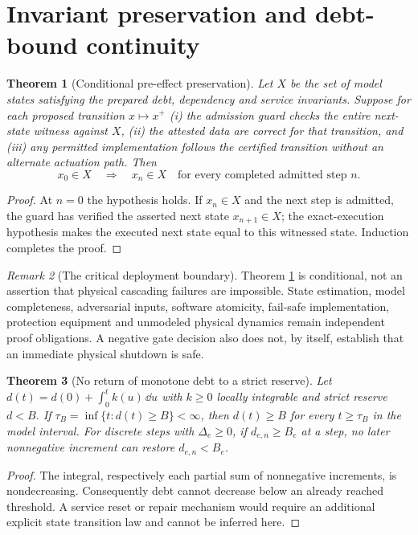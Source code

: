 \documentclass[11pt,letterpaper]{article}
\newtheorem{theorem}{Theorem}[section]
\theoremstyle{definition}\newtheorem{definition}[theorem]{Definition}\newtheorem{example}[theorem]{Example}
\theoremstyle{remark}\newtheorem{remark}[theorem]{Remark}
\begin{document}
\section{Invariant preservation and debt-bound continuity}
\begin{theorem}[Conditional pre-effect preservation]\label{th:invariant}
Let $X$ be the set of model states satisfying the prepared debt, dependency and service invariants. Suppose for each proposed transition $x\mapsto x^+$ (i) the admission guard checks the \emph{entire} next-state witness against $X$, (ii) the attested data are correct for that transition, and (iii) any permitted implementation follows the certified transition without an alternate actuation path. Then
\begin{equation}\label{eq:induction}
x_0\in X\quad\Longrightarrow\quad x_n\in X\quad\text{for every completed admitted step }n.
\end{equation}
\end{theorem}
\begin{proof}
At $n=0$ the hypothesis holds. If $x_n\in X$ and the next step is admitted, the guard has verified the asserted next state $x_{n+1}\in X$; the exact-execution hypothesis makes the executed next state equal to this witnessed state. Induction completes the proof.
\end{proof}
\begin{remark}[The critical deployment boundary]
Theorem \ref{th:invariant} is conditional, not an assertion that physical cascading failures are impossible. State estimation, model completeness, adversarial inputs, software atomicity, fail-safe implementation, protection equipment and unmodeled physical dynamics remain independent proof obligations. A negative gate decision also does not, by itself, establish that an immediate physical shutdown is safe.
\end{remark}
\begin{theorem}[No return of monotone debt to a strict reserve]\label{th:debt}
Let $d(t)=d(0)+\int_0^t k(u)\,\dd u$ with $k\ge0$ locally integrable and strict reserve $d<B$. If $\tau_B=\inf\{t:d(t)\ge B\}<\infty$, then $d(t)\ge B$ for every $t\ge\tau_B$ in the model interval. For discrete steps with $\Delta_e\ge0$, if $d_{e,n}\ge B_e$ at a step, no later nonnegative increment can restore $d_{e,n}<B_e$.
\end{theorem}
\begin{proof}
The integral, respectively each partial sum of nonnegative increments, is nondecreasing. Consequently debt cannot decrease below an already reached threshold. A service reset or repair mechanism would require an additional explicit state transition law and cannot be inferred here.
\end{proof}
\end{document}
